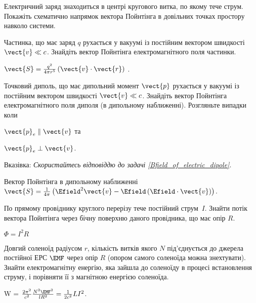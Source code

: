 \begin{problem}
    Електричний заряд знаходиться в центрі кругового витка, по якому тече струм. Покажіть схематично напрямок вектора Пойнтінга в довільних точках простору навколо системи.
\end{problem}

\begin{problem}
    Частинка, що має заряд $q$ рухається у вакуумі із постійним вектором швидкості $\vect{v} \ll c$. Знайдіть вектор Пойнтінга електромагнітного поля частинки.
\begin{solution}
	$\vect{S} = \frac{q^2}{4\pi r^5} \left( \vect{v} \cdot \vect{r}\right)$ .
\end{solution}
\end{problem}

\begin{problem}
    Точковий диполь, що має дипольний момент $\vect{p}$ рухається у вакуумі із постійним вектором швидкості $\vect{v} \ll c$. Знайдіть вектор Пойнтінга електромагнітного поля диполя (в дипольному наближенні). Розгляньте випадки коли
	\begin{enumerate*}[label=\alph*)]
		\item 	$\vect{p}_e \parallel \vect{v}$ та
		\item   $\vect{p}_e \perp \vect{v}$.
	\end{enumerate*}

	Вказівка: \emph{Скористайтесь відповіддю до задачі \ref{Bfield_of_electric_dipole}.}
\begin{solution}
	Вектор Пойнтінга в дипольному наближенні $\vect{S} = \frac{1}{4\pi} \left( \Efield^2 \vect{v} - \Efield\left(\Efield\cdot\vect{v} \right) \right) $.
\end{solution}
\end{problem}

\begin{problem}%
По прямому провіднику круглого перерізу тече постійний струм~$I$. Знайти потік вектора Пойнтінга через бічну поверхню даного провідника, що має опір $R$.
\begin{solution}
	$\Phi = I^2R$
\end{solution}
\end{problem}

\begin{problem}
    Довгий соленоїд радіусом $r$, кількість витків якого  $N$ під'єднується до джерела постійної ЕРС $\EMF$ через опір $R$ (опором самого соленоїда можна знехтувати). Знайти електромагнітну енергію, яка зайшла до соленоїду в процесі встановлення струму, і порівняти її з магнітною енергією соленоїда.
\begin{solution}
	W = $\frac{2\pi^2}{c^2} \frac{N^2\EMF^2}{lR^2} = \frac{1}{2c^2} LI^2$.
\end{solution}
\end{problem}

